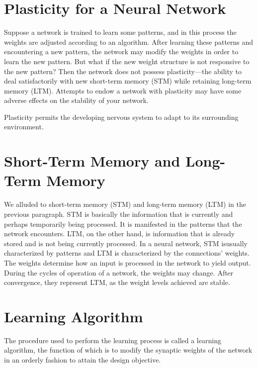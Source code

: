 \documentclass[12pt, right open]{memoir}
\begin{document}
\section{Plasticity for a Neural Network}
Suppose a network is trained to learn some patterns, and in this process the
weights are adjusted according to an algorithm. After learning these patterns
and encountering a new pattern, the network may modify the weights in order
to learn the new pattern. But what if the new weight structure is not responsive
to the new pattern? Then the network does not possess plasticity—the ability
to deal satisfactorily with new short-term memory (STM) while retaining
long-term memory (LTM). Attempts to endow a network with plasticity may
have some adverse effects on the stability of your network.

Plasticity permits the developing nervous system to adapt to its surrounding environment.
\section{Short-Term Memory and Long-Term Memory}
We alluded to short-term memory (STM) and long-term memory (LTM) in the
previous paragraph. STM is basically the information that is currently and
perhaps temporarily being processed. It is manifested in the patterns that the
network encounters. LTM, on the other hand, is information that is already
stored and is not being currently processed. In a neural network, STM isusually characterized by patterns and LTM is characterized by the
connections’ weights. The weights determine how an input is processed in the
network to yield output. During the cycles of operation of a network, the
weights may change. After convergence, they represent LTM, as the weight
levels achieved are stable.

\section{Learning Algorithm}
The procedure used to perform the learning process is called a learning algorithm, the function of which is to modify the synaptic weights of the network in an orderly fashion to attain the design objective.
\end{document}
